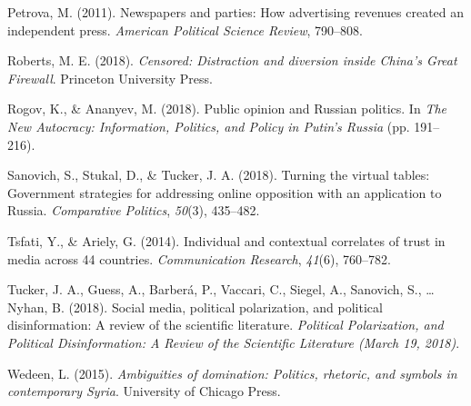 \documentclass[
  english,
  man]{apa6}
\begin{document}
\leavevmode\hypertarget{ref-petrovaNewspapersPartiesHow2011}{}%
Petrova, M. (2011). Newspapers and parties: How advertising revenues created an independent press. \emph{American Political Science Review}, 790--808.

\leavevmode\hypertarget{ref-robertsCensoredDistractionDiversion2018}{}%
Roberts, M. E. (2018). \emph{Censored: Distraction and diversion inside China's Great Firewall}. Princeton University Press.

\leavevmode\hypertarget{ref-rogovPublicOpinionRussian2018}{}%
Rogov, K., \& Ananyev, M. (2018). Public opinion and Russian politics. In \emph{The New Autocracy: Information, Politics, and Policy in Putin's Russia} (pp. 191--216).

\leavevmode\hypertarget{ref-sanovichTurningVirtualTables2018}{}%
Sanovich, S., Stukal, D., \& Tucker, J. A. (2018). Turning the virtual tables: Government strategies for addressing online opposition with an application to Russia. \emph{Comparative Politics}, \emph{50}(3), 435--482.

\leavevmode\hypertarget{ref-tsfatiIndividualContextualCorrelates2014}{}%
Tsfati, Y., \& Ariely, G. (2014). Individual and contextual correlates of trust in media across 44 countries. \emph{Communication Research}, \emph{41}(6), 760--782.

\leavevmode\hypertarget{ref-tuckerSocialMediaPolitical2018}{}%
Tucker, J. A., Guess, A., Barberá, P., Vaccari, C., Siegel, A., Sanovich, S., \ldots{} Nyhan, B. (2018). Social media, political polarization, and political disinformation: A review of the scientific literature. \emph{Political Polarization, and Political Disinformation: A Review of the Scientific Literature (March 19, 2018)}.

\leavevmode\hypertarget{ref-wedeenAmbiguitiesDominationPolitics2015}{}%
Wedeen, L. (2015). \emph{Ambiguities of domination: Politics, rhetoric, and symbols in contemporary Syria}. University of Chicago Press.

\endgroup
\end{document}
